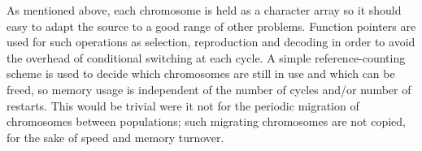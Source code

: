 As mentioned above, each chromosome is held as a character array so
it should easy to adapt the source to a good range of other problems.
Function pointers are used for such operations as selection,
reproduction and decoding in order to avoid the overhead of 
conditional switching at each cycle. A simple reference-counting scheme is
used to decide which chromosomes are still in use and which can be
freed, so memory usage is independent of the number of cycles and/or
number of restarts. This would be trivial were it not for the periodic
migration of chromosomes between populations; such migrating chromosomes
are not copied, for the sake of speed and memory turnover.


